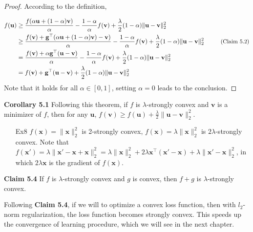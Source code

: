 \documentclass{article}
\newtheorem*{proof}{Proof}
\begin{document}
	\begin{proof} According to the definition,
	
	\begin{equation*}
	\begin{split}
	f(\mathbf{u}) &\geq \frac{f(\alpha\mathbf{u} + (1-\alpha)\mathbf{v})}{\alpha} - \frac{1-\alpha}{\alpha} f(\mathbf{v}) + \frac{\lambda}{2} (1-\alpha) \|\mathbf{u}-\mathbf{v}\|^2_2 \\
	& \geq \frac{f(\mathbf{v}) + \mathbf{g}^\top (\alpha\mathbf{u} + (1-\alpha)\mathbf{v}) - \mathbf{v}) }{\alpha} - \frac{1-\alpha}{\alpha} f(\mathbf{v}) + \frac{\lambda}{2} (1-\alpha) \|\mathbf{u}-\mathbf{v}\|^2_2\ \ \ \ \ \ \ \ \small{\text{(Claim 5.2)}}  \\
	&= \frac{f(\mathbf{v}) + \alpha \mathbf{g}^\top (\mathbf{u} - \mathbf{v}) }{\alpha} - \frac{1-\alpha}{\alpha} f(\mathbf{v}) + \frac{\lambda}{2} (1-\alpha) \|\mathbf{u}-\mathbf{v}\|^2_2 \\
	&= f(\mathbf{v}) + \mathbf{g}^\top (\mathbf{u} - \mathbf{v}) + \frac{\lambda}{2} (1-\alpha) \|\mathbf{u}-\mathbf{v}\|^2_2
	\end{split}
	\end{equation*}
Note that it holds for all $\alpha\in[0,1]$, setting $\alpha=0$ leads to the conclusion.
	\end{proof}

	\textbf{Corollary 5.1} Following this theorem, if $f$ is $\lambda$-strongly convex and $\mathbf{v}$ is a minimizer of $f$, then for any $\mathbf{u}$, $f(\mathbf{v})\geq f(\mathbf{u}) +\frac{\lambda}{2}\|\mathbf{u}-\mathbf{v}\|^2_2$.

	\begin{itemize}
	\item[Ex8] $f(\mathbf{x})=\|\mathbf{x}\|^2_2$ is 2-strongly convex, $f(\mathbf{x})=\lambda\|\mathbf{x}\|^2_2$ is $2\lambda$-strongly convex. Note that $f(\mathbf{x}')=\lambda\|\mathbf{x}'-\mathbf{x}+\mathbf{x}\|^2_2 = \lambda\|\mathbf{x}\|^2_2 + 2\lambda \mathbf{x}^\top (\mathbf{x}'-\mathbf{x}) + \lambda\|\mathbf{x}'-\mathbf{x}\|^2_2$, in which $2\lambda \mathbf{x}$ is the gradient of $f(\mathbf{x})$.
	\end{itemize}
	
	\textbf{Claim 5.4} If $f$ is $\lambda$-strongly convex and $g$ is convex, then $f+g$ is $\lambda$-strongly convex.

	Following \textbf{Claim 5.4}, if we will to optimize a convex loss function, then with $l_2$-norm regularization, the loss function becomes strongly convex. This speeds up the convergence of learning procedure, which we will see in the next chapter.
	
\end{document}
